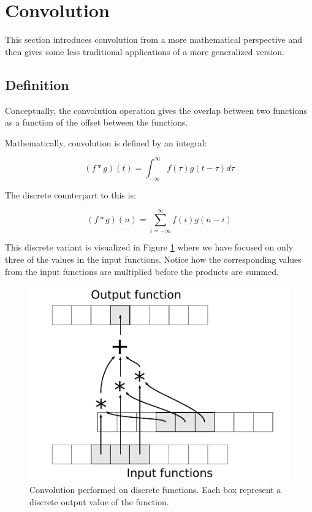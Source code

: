 \section{Convolution}
This section introduces convolution from a more mathematical perspective and then gives some less traditional applications of a more generalized version.

\subsection{Definition}
Conceptually, the convolution operation gives the overlap between two functions as a function of the offset between the functions.

Mathematically, convolution is defined by an integral:

\[
    (f * g)(t) = \int^{\infty}_{-\infty}{f(\tau)g(t-\tau) d\tau}
\]

The discrete counterpart to this is:

\[
    (f * g)(n) = \sum^{\infty}_{i=-\infty}{f(i)g(n-i)}
\]

This discrete variant is visualized in Figure \ref{fig:VisualConvolution} where we have focused on only three of the values in the input functions.
Notice how the corresponding values from the input functions are multiplied before the products are summed.

\begin{figure}
    \centering
    \includegraphics{img/VisualConvolution}
    \caption{
        Convolution performed on discrete functions.
        Each box represent a discrete output value of the function.
    }
    \label{fig:VisualConvolution}
\end{figure}

